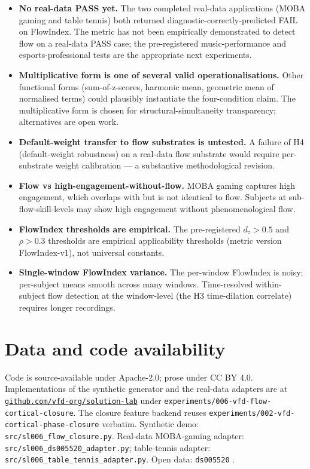 \documentclass[11pt,a4paper]{article}
\begin{document}
\begin{itemize}\itemsep0pt
\item \textbf{No real-data PASS yet.} The two completed real-data applications (MOBA gaming and table tennis) both returned diagnostic-correctly-predicted FAIL on FlowIndex. The metric has not been empirically demonstrated to detect flow on a real-data PASS case; the pre-registered music-performance and esports-professional tests are the appropriate next experiments.
\item \textbf{Multiplicative form is one of several valid operationalisations.} Other functional forms (sum-of-z-scores, harmonic mean, geometric mean of normalised terms) could plausibly instantiate the four-condition claim. The multiplicative form is chosen for structural-simultaneity transparency; alternatives are open work.
\item \textbf{Default-weight transfer to flow substrates is untested.} A failure of H4 (default-weight robustness) on a real-data flow substrate would require per-substrate weight calibration --- a substantive methodological revision.
\item \textbf{Flow vs high-engagement-without-flow.} MOBA gaming captures high engagement, which overlaps with but is not identical to flow. Subjects at sub-flow-skill-levels may show high engagement without phenomenological flow.
\item \textbf{FlowIndex thresholds are empirical.} The pre-registered $d_z > 0.5$ and $\rho > 0.3$ thresholds are empirical applicability thresholds (metric version FlowIndex-v1), not universal constants.
\item \textbf{Single-window FlowIndex variance.} The per-window FlowIndex is noisy; per-subject means smooth across many windows. Time-resolved within-subject flow detection at the window-level (the H3 time-dilation correlate) requires longer recordings.
\end{itemize}

\section{Data and code availability}\label{sec:data}

Code is source-available under Apache-2.0; prose under CC BY 4.0. Implementations of the synthetic generator and the real-data adapters are at \href{https://github.com/vfd-org/solution-lab}{\texttt{github.com/vfd-org/solution-lab}} under \texttt{experiments/006-vfd-flow-cortical-closure}. The closure feature backend reuses \texttt{experiments/002-vfd-cortical-phase-closure} verbatim. Synthetic demo: \texttt{src/sl006\_flow\_closure.py}. Real-data MOBA-gaming adapter: \texttt{src/sl006\_ds005520\_adapter.py}; table-tennis adapter: \texttt{src/sl006\_table\_tennis\_adapter.py}. Open data: \texttt{ds005520} \citep{LiMOBA2024}.
\end{document}
